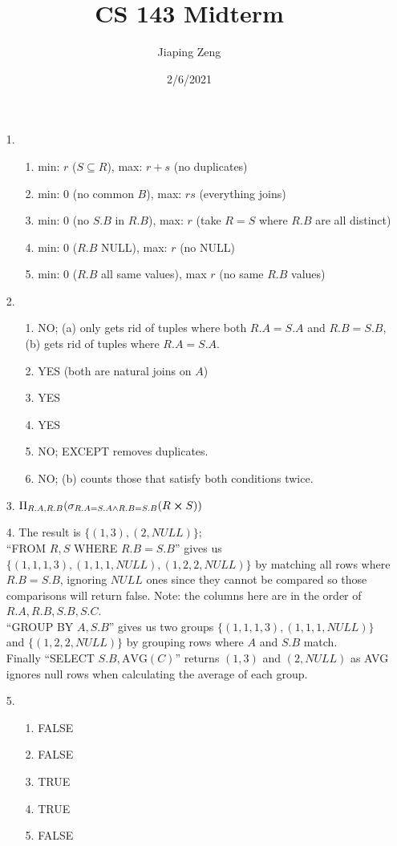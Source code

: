 \documentclass{article}
\title{CS 143 Midterm}
\date{2/6/2021}
\author{Jiaping Zeng}
\begin{document}

\begin{itemize}
      \item [1.]
            \begin{itemize}
                  \item [1.] min: $r$ ($S\subseteq R$), max: $r+s$ (no duplicates)
                  \item [2.] min: $0$ (no common $B$), max: $rs$ (everything joins)
                  \item [3.] min: $0$ (no $S.B$ in $R.B$), max: $r$ (take $R=S$ where $R.B$ are all distinct)
                  \item [4.] min: $0$ ($R.B$ NULL), max: $r$ (no NULL)
                  \item [5.] min: $0$ ($R.B$ all same values), max $r$ (no same $R.B$ values)
            \end{itemize}
      \item [2.]
            \begin{itemize}
                  \item [1.] NO; (a) only gets rid of tuples where both $R.A=S.A$ and $R.B=S.B$, (b) gets rid of tuples where $R.A=S.A$.
                  \item [2.] YES (both are natural joins on $A$)
                  \item [3.] YES
                  \item [4.] YES
                  \item [5.] NO; EXCEPT removes duplicates.
                  \item [6.] NO; (b) counts those that satisfy both conditions twice.
            \end{itemize}
      \item [3.] $\Pi_{R.A,R.B}(\sigma_{R.A=S.A\wedge R.B=S.B}(R\cross S))$
      \item [4.] The result is $\{(1,3),(2,NULL)\}$;\\
            ``FROM $R,S$ WHERE $R.B=S.B$'' gives us $\{(1,1,1,3), (1,1,1,NULL), (1,2,2,NULL)\}$ by matching all rows where $R.B=S.B$, ignoring $NULL$ ones since they cannot be compared so those comparisons will return false. Note: the columns here are in the order of $R.A,R.B,S.B,S.C$.\\
            ``GROUP BY $A,S.B$'' gives us two groups $\{(1,1,1,3), (1,1,1,NULL)\}$ and $\{(1,2,2,NULL)\}$ by grouping rows where $A$ and $S.B$ match.\\
            Finally ``SELECT $S.B,\text{AVG}(C)$'' returns $(1,3)$ and $(2,NULL)$ as AVG ignores null rows when calculating the average of each group.
      \item [5.]
            \begin{itemize}
                  \item [1.] FALSE
                  \item [2.] FALSE
                  \item [3.] TRUE
                  \item [4.] TRUE
                  \item [5.] FALSE
            \end{itemize}
\end{itemize}
\end{document}
